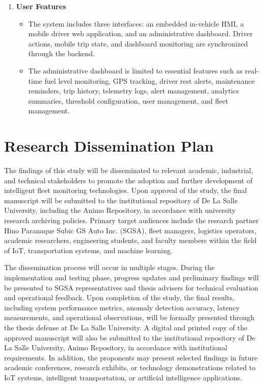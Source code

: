 \begin{enumerate}
	\item \textbf{User Features}
		\begin{itemize}
			\item The system includes three interfaces: an embedded in-vehicle HMI, a mobile driver web application, and an administrative dashboard. Driver actions, mobile trip state, and dashboard monitoring are synchronized through the backend.
			\item The administrative dashboard is limited to essential features such as real-time fuel level monitoring, GPS tracking, driver rest alerts, maintenance reminders, trip history, telemetry logs, alert management, analytics summaries, threshold configuration, user management, and fleet management.
		\end{itemize}


\end{enumerate}

\section{Research Dissemination Plan}
The findings of this study will be disseminated to relevant academic, industrial, and technical stakeholders to promote the adoption and further development of intelligent fleet monitoring technologies. Upon approval of the study, the final manuscript will be submitted to the institutional repository of De La Salle University, including the Animo Repository, in accordance with university research archiving policies. Primary target audiences include the research partner Hino Paranaque Subic GS Auto Inc. (SGSA), fleet managers, logistics operators, academic researchers, engineering students, and faculty members within the field of IoT, transportation systems, and machine learning.

The dissemination process will occur in multiple stages. During the implementation and testing phase, progress updates and preliminary findings will be presented to SGSA representatives and thesis advisers for technical evaluation and operational feedback. Upon completion of the study, the final results, including system performance metrics, anomaly detection accuracy, latency measurements, and operational observations, will be formally presented through the thesis defense at De La Salle University. A digital and printed copy of the approved manuscript will also be submitted to the institutional repository of De La Salle University, Animo Repository, in accordance with institutional requirements. In addition, the proponents may present selected findings in future academic conferences, research exhibits, or technology demonstrations related to IoT systems, intelligent transportation, or artificial intelligence applications.

